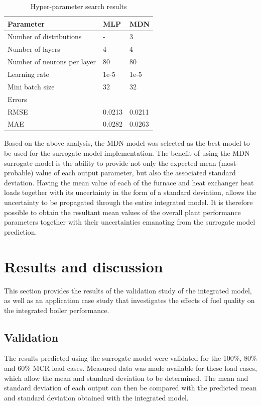 \documentclass[a4paper,fleqn]{cas-sc}
\begin{document}
\begin{table}[h!]
\caption{Hyper-parameter search results}\label{tbl_hyper_results}
\begin{tabular*}{\tblwidth}{lp{}l}
\toprule
 Parameter& MLP & MDN \\ %
\midrule
 Number of distributions & - & 3  \\
 Number of layers & 4 & 4\\
 Number of neurons per layer & 80  & 80\\
 Learning rate & 1e-5 &  1e-5   \\
 Mini batch size  &32 & 32  \\
\midrule
Errors & &\\
\midrule
RMSE & 0.0213 & 0.0211\\
MAE & 0.0282& 0.0263\\
\bottomrule
\end{tabular*}
\end{table}  

Based on the above analysis, the MDN model was selected as the best model to be used for the surrogate model implementation. The benefit of using the MDN surrogate model is the ability to provide not only the expected mean (most-probable) value of each output parameter, but also the associated standard deviation. Having the mean value of each of the furnace and heat exchanger heat loads together with its uncertainty in the form of a standard deviation, allows the uncertainty to be propagated through the entire integrated model. It is therefore possible to obtain the resultant mean values of the overall plant performance parameters together with their uncertainties emanating from the surrogate model prediction.

\section{Results and discussion}\label{sec_results_diss}
This section provides the results of the validation study of the integrated model, as well as an application case study that investigates the effects of fuel quality on the integrated boiler performance. 

\subsection{Validation}\label{sec_result_1}
The results predicted using the surrogate model were validated for the 100\%, 80\% and 60\% MCR load cases. Measured data was made available for these load cases, which allow the mean and standard deviation to be determined.  The mean and standard deviation of each output can then be compared with the predicted mean and standard deviation obtained with the integrated model.\\
\end{document}
